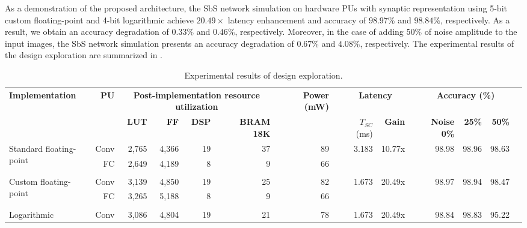 As a demonstration of the proposed architecture, the SbS network simulation on hardware PUs with synaptic representation using 5-bit custom floating-point and 4-bit logarithmic achieve $20.49\times$ latency enhancement and accuracy of $98.97\%$ and $98.84\%$, respectively. As a result, we obtain an accuracy degradation of $0.33\%$ and $0.46\%$, respectively. Moreover, in the case of adding 50\% of noise amplitude to the input images, the SbS network simulation presents an accuracy degradation of $0.67\%$ and $4.08\%$, respectively. The experimental results of the design exploration are summarized in .

\begin{table}[!t]
	\begin{threeparttable}
		\centering
		\caption{Experimental results of design exploration.}\label{tab:results}
		\scriptsize
		\begin{tabular}{lrrrrrrrrrrrrrrr}\toprule
			\multirow{2}{*}{\textbf{Implementation}} &\multirow{2}{*}{\textbf{PU}} &\multicolumn{4}{c}{\textbf{Post-implementation resource utilization}} & &\multirow{2}{*}{\textbf{Power (mW)}} & &\multicolumn{2}{c}{\textbf{Latency}} & &\multicolumn{3}{c}{\textbf{Accuracy (\%)\tnote{e}}} \\\cmidrule{3-6}\cmidrule{10-11}\cmidrule{13-15}
			& &\textbf{LUT} &\textbf{FF} &\textbf{DSP} &\textbf{BRAM 18K} & & & &$T_{SC}$ (ms) &\textbf{Gain\tnote{d}} & &\textbf{Noise 0\%} &\textbf{25\%} &\textbf{50\%} \\\midrule
			\multirow{2}{*}{Standard floating-point\tnote{a}} &Conv &2,765 &4,366 &19 &37 & &89 & &\multirow{2}{*}{3.183} &\multirow{2}{*}{10.77x} & &\multirow{2}{*}{98.98} &\multirow{2}{*}{98.96} &\multirow{2}{*}{98.63} \\
			&FC &2,649 &4,189 &8 &9 & &66 & & & & & & & \\
			& & & & & & & & & & & & & & \\
			\multirow{2}{*}{Custom floating-point\tnote{b}} &Conv &3,139 &4,850 &19 &25 & &82 & &\multirow{2}{*}{1.673} &\multirow{2}{*}{20.49x} & &\multirow{2}{*}{98.97} &\multirow{2}{*}{98.94} &\multirow{2}{*}{98.47} \\
			&FC &3,265 &5,188 &8 &9 & &66 & & & & & & & \\
			& & & & & & & & & & & & & & \\
			\multirow{2}{*}{Logarithmic\tnote{c}} &Conv &3,086 &4,804 &19 &21 & &78 & &\multirow{2}{*}{1.673} &\multirow{2}{*}{20.49x} & &\multirow{2}{*}{98.84} &\multirow{2}{*}{98.83} &\multirow{2}{*}{95.22} \\

\end{tabular}
\end{threeparttable}
\end{table}
